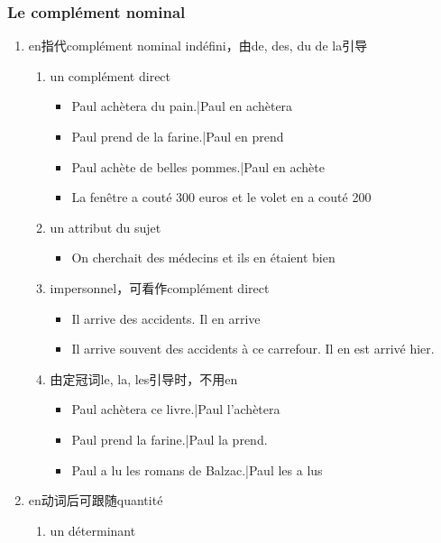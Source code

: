 \documentclass[UTF8]{report}
\begin{document}
\subsubsection{Le complément nominal}
\begin{enumerate}
    \item en指代complément nominal indéfini，由de, des, du de la引导
    \begin{enumerate}
        \item un complément direct
        \begin{itemize}
            \item Paul achètera du pain.|Paul en achètera
            \item Paul prend de la farine.|Paul en prend
            \item Paul achète de belles pommes.|Paul en achète
            \item La fenêtre a couté 300 euros et le volet en a couté 200
        \end{itemize}
        \item un attribut du sujet
        \begin{itemize}
            \item On cherchait des médecins et ils en étaient bien
        \end{itemize}
        \item impersonnel，可看作complément direct
        \begin{itemize}
            \item Il arrive des accidents. Il en arrive
            \item Il arrive souvent des accidents à ce carrefour. Il en est arrivé hier.
        \end{itemize}
        \item 由定冠词le, la, les引导时，不用en
        \begin{itemize}
            \item Paul achètera ce livre.|Paul l’achètera
            \item Paul prend la farine.|Paul la prend.
            \item Paul a lu les romans de Balzac.|Paul les a lus
        \end{itemize}
    \end{enumerate}
    \item en动词后可跟随quantité
    \begin{enumerate}
        \item un déterminant
        \begin{itemize}

\end{itemize}
\end{enumerate}
\end{enumerate}
\end{document}
